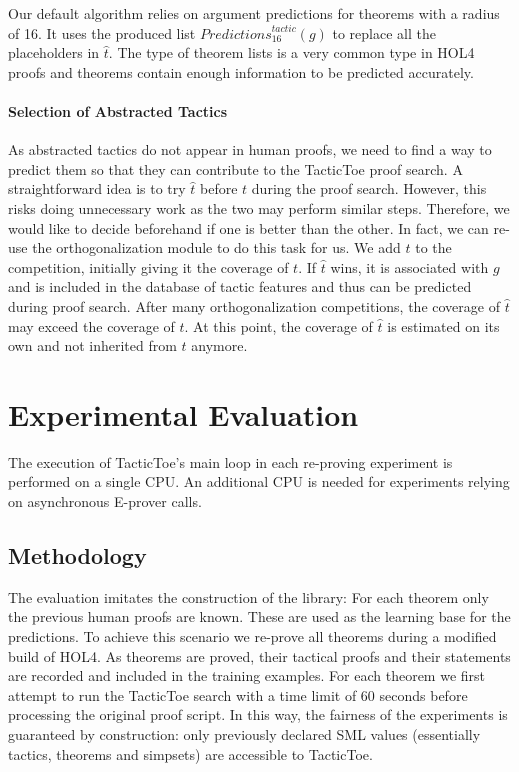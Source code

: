 \documentclass[runningheads,a4paper,draft]{svjour3}
\def\holfour{\textsf{HOL4}\xspace}
\def\eprover{\textsf{E-prover}\xspace}
\def\sml{\textsf{SML}\xspace}
\def\tactictoe{\textsf{TacticToe}\xspace}
\begin{document}
Our default algorithm relies on argument predictions for theorems with a
radius of 16. It uses the produced list
$\mathit{Predictions}^{\mathit{tactic}}_{16}(g)$ to replace all the
placeholders
in $\hat{t}$.
The type of theorem lists is a very common type in \holfour proofs and theorems contain
enough information to be predicted accurately.


\paragraph{Selection of Abstracted Tactics}
As abstracted tactics do not appear in human proofs, we need to find a way to
predict them so that they can contribute to the \tactictoe proof search.
A straightforward idea is to try $\hat{t}$ before $t$ during the proof search.
However, this risks doing unnecessary work as the two may perform similar steps.
Therefore, we would like to decide
beforehand if one is better than the other.
In fact, we can re-use the orthogonalization module to do this task for us.
We add $\hat{t}$ to the competition, initially giving it the coverage of $t$.
If $\hat{t}$
wins, it is associated with $g$ and is included in the database of tactic
features and thus can be predicted during proof search.
After many orthogonalization competitions, the coverage of $\hat{t}$ may exceed
the coverage of
$t$. At
this point, the coverage of $\hat{t}$ is estimated on its own and not inherited
from
$t$ anymore.




\section{Experimental Evaluation}\label{s:experiments}
The execution of \tactictoe's main loop in each re-proving experiment is
performed on a single CPU. An additional CPU is needed for experiments relying
on asynchronous \eprover calls.


\subsection{Methodology}
The evaluation imitates the construction of the library: For each theorem only
the previous human proofs are known. These are used as the learning base for
the predictions.
To achieve this scenario we re-prove all theorems during a modified build of
\holfour.
As theorems are proved, their tactical proofs and their statements are
recorded and included in the training examples.
For each theorem we first attempt to run the \tactictoe search with a time
limit of 60 seconds before processing the original proof script.
In this way, the fairness of the experiments is guaranteed by construction:
only previously declared \sml values (essentially tactics, theorems and
simpsets) are accessible to \tactictoe.
\end{document}

